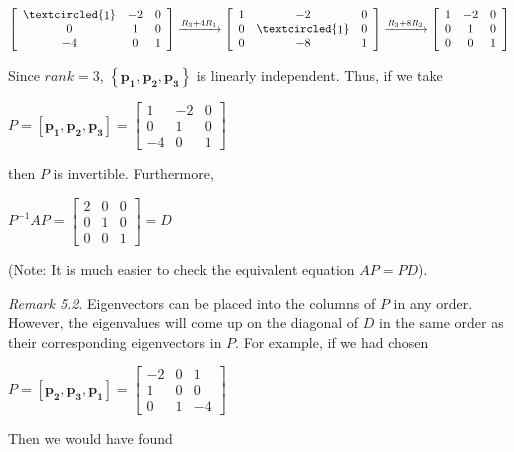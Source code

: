 \documentclass[
  letterpaper,
  DIV=11,
  numbers=noendperiod]{scrartcl}
\theoremstyle{remark}
\begin{document}
\(\left[\begin{array}{ccc} \textcircled{\raisebox{-0.9pt}{1}} & -2 & 0 \\ 0 & 1 & 0 \\ -4 & 0 & 1 \end{array}\right] \xrightarrow{R_{3} + 4R_{1}} \left[\begin{array}{ccc} 1 & -2 & 0 \\ 0 & \textcircled{\raisebox{-0.9pt}{1}} & 0 \\ 0 & -8 & 1 \end{array}\right] \xrightarrow{R_{3} + 8R_{2}} \left[\begin{array}{ccc} 1 & -2 & 0 \\ 0 & 1 & 0 \\ 0 & 0 & 1 \end{array}\right]\)

Since \(rank = 3\),
\(\left\{\mathbf{p_{1}}, \mathbf{p_{2}}, \mathbf{p_{3}}\right\}\) is
linearly independent. Thus, if we take

\(P = \left[\mathbf{p_{1}}, \mathbf{p_{2}}, \mathbf{p_{3}}\right] = \left[\begin{array}{ccc} 1 & -2 & 0 \\ 0 & 1 & 0 \\ -4 & 0 & 1 \end{array}\right]\)

then \(P\) is invertible. Furthermore,

\(P^{-1}AP = \left[\begin{array}{ccc} 2 & 0 & 0 \\ 0 & 1 & 0 \\ 0 & 0 & 1 \end{array}\right] = D\)

(Note: It is much easier to check the equivalent equation \(AP = PD\)).

\emph{Remark 5.2}. Eigenvectors can be placed into the columns of \(P\)
in any order. However, the eigenvalues will come up on the diagonal of
\(D\) in the same order as their corresponding eigenvectors in \(P\).
For example, if we had chosen

\(P = \left[\mathbf{p_{2}}, \mathbf{p_{3}}, \mathbf{p_{1}}\right] = \left[\begin{array}{ccc} -2 & 0 & 1 \\ 1 & 0 & 0 \\ 0 & 1 & -4 \end{array}\right]\)

Then we would have found
\end{document}
